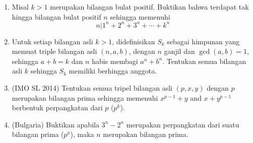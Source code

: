 \documentclass[12pt]{scrartcl}
\begin{document}
\begin{enumerate}[resume]
    \item  Misal $ k > 1$ merupakan bilangan bulat positif. Buktikan bahwa terdapat tak hingga bilangan bulat positif $n$ sehingga memenuhi
    $$n | 1^n + 2^n + 3^n + \cdots +k^n$$

    \item Untuk setiap bilangan asli $k>1$, didefinisikan $S_k$ sebagai himpunan yang memuat triple bilangan asli $(n,a,b)$, dengan $n$ ganjil dan $\gcd (a,b)=1$, sehingga $a+b=k$ dan $n$ habis membagi $a^n+b^n$. Tentukan semua bilangan asli $k$ sehingga $S_k$ memiliki berhingga anggota.

    \item (IMO SL 2014) Tentukan semua tripel bilangan asli $(p, x, y)$ dengan $p$ merupakan bilangan prima sehingga memenuhi $x^{p -1} + y$ and $x + y^ {p -1}$ berbentuk perpangkatan dari $p$ ($p^k$). 

    \item (Bulgaria) Buktikan apabila $3^n-2^n$ merupakan perpangkatan dari suatu bilangan prima ($p^a$), maka $n$ merupakan bilangan prima.
\end{enumerate}
\end{document}
